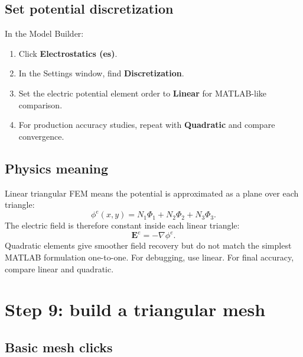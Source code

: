 \documentclass[11pt]{article}
\newcommand{\Evec}{\mathbf{E}}
\begin{document}
\subsection{Set potential discretization}

In the Model Builder:
\begin{enumerate}[leftmargin=2em]
\item Click \textbf{Electrostatics (es)}.
\item In the Settings window, find \textbf{Discretization}.
\item Set the electric potential element order to \textbf{Linear} for MATLAB-like comparison.
\item For production accuracy studies, repeat with \textbf{Quadratic} and compare convergence.
\end{enumerate}

\subsection{Physics meaning}

Linear triangular FEM means the potential is approximated as a plane over each triangle:
\begin{equation}
\phi^e(x,y)=N_1\Phi_1+N_2\Phi_2+N_3\Phi_3.
\end{equation}
The electric field is therefore constant inside each linear triangle:
\begin{equation}
\Evec^e=-\nabla\phi^e.
\end{equation}
Quadratic elements give smoother field recovery but do not match the simplest MATLAB formulation one-to-one. For debugging, use linear. For final accuracy, compare linear and quadratic.

\section{Step 9: build a triangular mesh}

\subsection{Basic mesh clicks}
\end{document}

